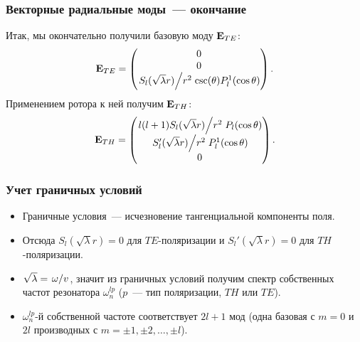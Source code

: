 \documentclass{beamer}
\begin{document}

    \begin{frame}\frametitle{Векторные радиальные моды~--- окончание}

        Итак, мы окончательно получили базовую моду $\vb{E}_{TE}$:
        \begin{equation}
            \vb{E}_{TE} = \begin{pmatrix}
                0 \\ 0 \\ \flatfrac{S_l(\sqrt\lambda r)}{r^2} \csc(\theta) P^1_l(\cos\theta)
            \end{pmatrix} .
        \end{equation}
        Применением ротора к ней получим $\vb{E}_{TH}$:
        \begin{equation}
            \vb{E}_{TH} = \begin{pmatrix}
                \flatfrac{l(l+1) S_l(\sqrt\lambda r)}{r^2} P_l(\cos\theta) \\
                \flatfrac{S_l'(\sqrt\lambda r)}{r^2} P_l^1(\cos\theta) \\
                0
            \end{pmatrix} .
        \end{equation}

    \end{frame}


    \begin{frame}\frametitle{Учет граничных условий}

        \begin{itemize}
            \item Граничные условия~--- исчезновение тангенциальной компоненты поля.

            \item Отсюда $S_l(\sqrt\lambda r) = 0$ для $TE$-поляризации и $S_l'(\sqrt\lambda r) = 0$ для $TH$-поляризации.

            \item $\sqrt\lambda = \flatfrac{\omega}{v}$, значит из граничных условий получим спектр собственных частот резонатора $\omega^{lp}_n$ ($p$~--- тип поляризации, $TH$ или $TE$).

            \item $\omega^{lp}_n$-й собственной частоте соответствует $2l + 1$ мод (одна базовая с $m = 0$ и $2l$ производных с $m = \pm 1, \pm 2, \dots, \pm l$).
        \end{itemize}

    \end{frame}
\end{document}
